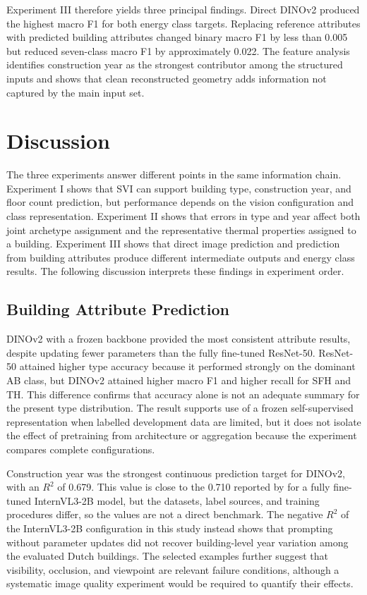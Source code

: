 Experiment III therefore yields three principal findings. Direct DINOv2 produced the highest macro F1 for both energy class targets. Replacing reference attributes with predicted building attributes changed binary macro F1 by less than 0.005 but reduced seven-class macro F1 by approximately 0.022. The feature analysis identifies construction year as the strongest contributor among the structured inputs and shows that clean reconstructed geometry adds information not captured by the main input set.

\section{Discussion}
\label{sec:discussion}

The three experiments answer different points in the same information chain. Experiment I shows that SVI can support building type, construction year, and floor count prediction, but performance depends on the vision configuration and class representation. Experiment II shows that errors in type and year affect both joint archetype assignment and the representative thermal properties assigned to a building. Experiment III shows that direct image prediction and prediction from building attributes produce different intermediate outputs and energy class results. The following discussion interprets these findings in experiment order.

\subsection{Building Attribute Prediction}

DINOv2 with a frozen backbone provided the most consistent attribute results, despite updating fewer parameters than the fully fine-tuned ResNet-50. ResNet-50 attained higher type accuracy because it performed strongly on the dominant AB class, but DINOv2 attained higher macro F1 and higher recall for SFH and TH. This difference confirms that accuracy alone is not an adequate summary for the present type distribution. The result supports use of a frozen self-supervised representation when labelled development data are limited, but it does not isolate the effect of pretraining from architecture or aggregation because the experiment compares complete configurations.

Construction year was the strongest continuous prediction target for DINOv2, with an $R^2$ of 0.679. This value is close to the 0.710 reported by \textcite{liang2025} for a fully fine-tuned InternVL3-2B model, but the datasets, label sources, and training procedures differ, so the values are not a direct benchmark. The negative $R^2$ of the InternVL3-2B configuration in this study instead shows that prompting without parameter updates did not recover building-level year variation among the evaluated Dutch buildings. The selected examples further suggest that visibility, occlusion, and viewpoint are relevant failure conditions, although a systematic image quality experiment would be required to quantify their effects.

